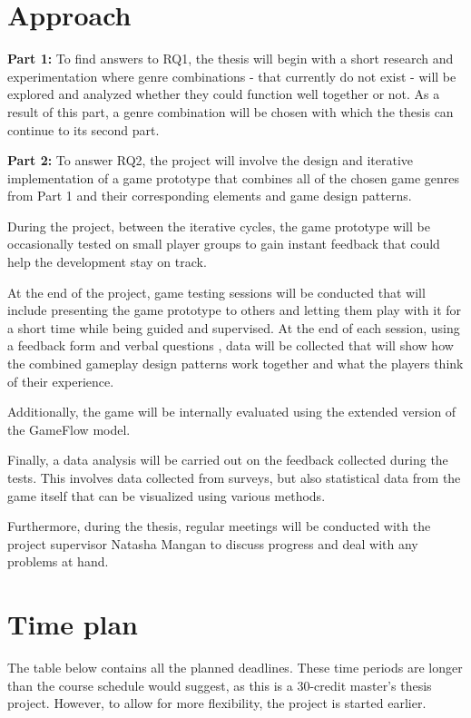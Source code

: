 \section{Approach}

\textbf{Part 1:} To find answers to RQ1, the thesis will begin with a short research and experimentation where genre combinations - that currently do not exist - will be explored and analyzed whether they could function well together or not. As a result of this part, a genre combination will be chosen with which the thesis can continue to its second part.

\textbf{Part 2:} To answer RQ2, the project will involve the design and iterative implementation of a game prototype that combines all of the chosen game genres from Part 1 and their corresponding elements and game design patterns. 

During the project, between the iterative cycles, the game prototype will be occasionally tested on small player groups to gain instant feedback that could help the development stay on track.

At the end of the project, game testing sessions will be conducted that will include presenting the game prototype to others and letting them play with it for a short time while being guided and supervised. At the end of each session, using a feedback form and verbal questions \cite{björk2015Interviews}, data will be collected that will show how the combined gameplay design patterns work together and what the players think of their experience.

Additionally, the game will be internally evaluated using the extended version of the GameFlow model\cite{sweetser2017gameflow}.

Finally, a data analysis will be carried out on the feedback collected during the tests. This involves data collected from surveys, but also statistical data from the game itself that can be visualized using various methods. \cite{björk2015DataVisualization} 

Furthermore, during the thesis, regular meetings will be conducted with the project supervisor Natasha Mangan to discuss progress and deal with any problems at hand.



\section{Time plan}

The table below contains all the planned deadlines. These time periods are longer than the course schedule would suggest, as this is a 30-credit master's thesis project. However, to allow for more flexibility, the project is started earlier.


